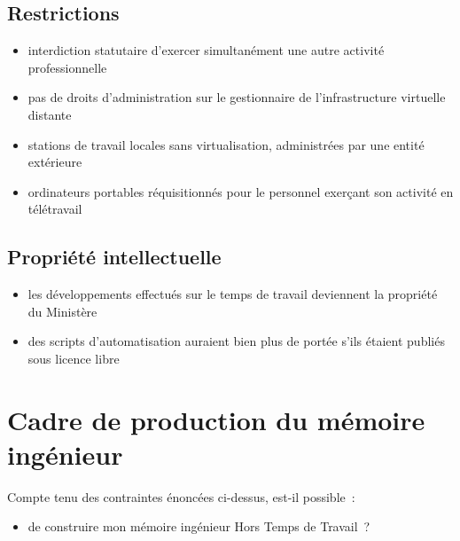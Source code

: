 \documentclass[10pt]{article}
\newenvironment{itmz}{\begin{itemize}
\setlength{\itemsep}{0em}
}{\end{itemize}}
\begin{document}
\subsection{Restrictions}

\begin{itmz}
\item{interdiction statutaire d’exercer simultanément une autre activité professionnelle}
\item{pas de droits d’administration sur le gestionnaire de l’infrastructure virtuelle distante}
\item{stations de travail locales sans virtualisation, administrées par une entité extérieure}
\item{ordinateurs portables réquisitionnés pour le personnel exerçant son activité en télétravail}
\end{itmz}

\subsection{Propriété intellectuelle}

\begin{itmz}
\item{les développements effectués sur le temps de travail deviennent la propriété du Ministère}
\item{des scripts d’automatisation auraient bien plus de portée s’ils étaient publiés sous licence libre}
\end{itmz}

\section{Cadre de production du mémoire ingénieur}

Compte tenu des contraintes énoncées ci-dessus, est-il possible :
\begin{itmz}
\item{de construire mon mémoire ingénieur Hors Temps de Travail ?}
\end{itmz}
\end{document}
